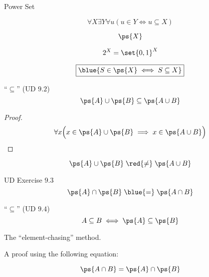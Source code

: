 \begin{frame}{}
  \centerline{\LARGE Power Set}

  \vspace{0.50cm}
\end{frame}

\begin{frame}{}
  \begin{definition}
    \[
      \forall X \exists Y \forall u (u \in Y \iff u \subseteq X)
    \]
  \end{definition}

  \[
    \ps{X}
  \]

  \pause
  \[
    2^{X} = \set{0,1}^{X}
  \]
\end{frame}

\begin{frame}{}
  \[
    \boxed{\blue{S \in \ps{X} \iff S \subseteq X}}
  \]
\end{frame}

\begin{frame}{}
  \begin{exampleblock}{``$\subseteq$'' (UD $9.2$)}
    \[
      \ps{A} \cup \ps{B} \subseteq \ps{A \cup B}
    \]
  \end{exampleblock}

  \pause
  \begin{proof}
    \[
      \forall x \Big(x \in \ps{A} \cup \ps{B} \implies x \in \ps{A \cup B}\Big)
    \]
  \end{proof}

  \pause
  \[
    \ps{A} \cup \ps{B} \;\red{\neq}\; \ps{A \cup B}
  \]

  \pause
  \begin{exampleblock}{UD Exercise $9.3$}
    \[
      \ps{A} \cap \ps{B} \;\blue{=}\; \ps{A \cap B}
    \]
  \end{exampleblock}
\end{frame}

\begin{frame}{}
  \begin{exampleblock}{``$\subseteq$'' (UD $9.4$)}
    \[
      A \subseteq B \iff \ps{A} \subseteq \ps{B}
    \]
  \end{exampleblock}

  \vspace{0.60cm}
  \centerline{The ``element-chasing'' method.}

  \pause
  \vspace{1.00cm}
  A proof using the following equation:

  \[
    \ps{A \cap B} = \ps{A} \cap \ps{B}
  \]
\end{frame}
